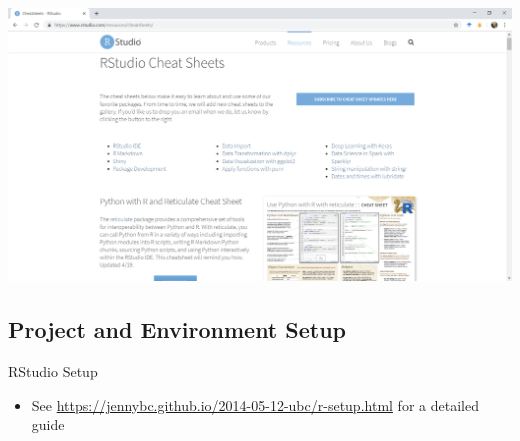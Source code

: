 \documentclass[
  ignorenonframetext,
]{beamer}
\providecommand{\tightlist}{%
  \setlength{\itemsep}{0pt}\setlength{\parskip}{0pt}}
\begin{document}
\begin{frame}

\includegraphics{../external/images/rstudio_dot_com_3_cheats.PNG}

\end{frame}

\hypertarget{project-and-environment-setup}{%
\subsection{Project and Environment
Setup}\label{project-and-environment-setup}}

\begin{frame}{RStudio Setup}
\protect\hypertarget{rstudio-setup-1}{}

\begin{itemize}[<+->]
\tightlist
\item
  See \url{https://jennybc.github.io/2014-05-12-ubc/r-setup.html} for a
  detailed guide
\end{itemize}

\end{frame}
\end{document}
